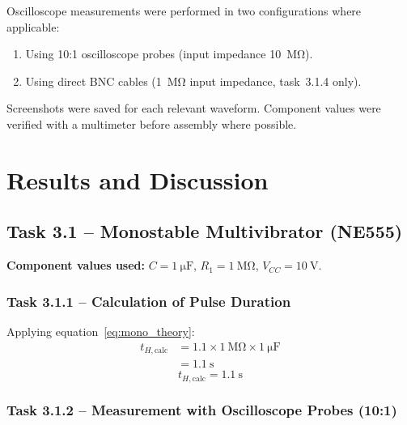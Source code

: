 \documentclass[12pt, a4paper]{article}
\begin{document}
Oscilloscope measurements were performed in two configurations where applicable:
\begin{enumerate}[leftmargin=1.5em]
  \item Using 10:1 oscilloscope probes (input impedance \SI{10}{\mega\ohm}).
  \item Using direct BNC cables (\SI{1}{\mega\ohm} input impedance, task~3.1.4 only).
\end{enumerate}

Screenshots were saved for each relevant waveform. Component values were verified
with a multimeter before assembly where possible.

\section{Results and Discussion}

\subsection{Task 3.1 -- Monostable Multivibrator (NE555)}

\textbf{Component values used:}
$C = \SI{1}{\micro\farad}$,\quad
$R_1 = \SI{1}{\mega\ohm}$,\quad
$V_{CC} = \SI{10}{\volt}$.

\subsubsection{Task 3.1.1 -- Calculation of Pulse Duration}

Applying equation~\eqref{eq:mono_theory}:
\begin{align*}
  t_{H,\text{calc}} &= 1.1 \times \SI{1}{\mega\ohm} \times \SI{1}{\micro\farad} \\
                    &= \SI{1.1}{\second}
\end{align*}
\[
  \boxed{t_{H,\text{calc}} = \SI{1.1}{\second}}
\]

\subsubsection{Task 3.1.2 -- Measurement with Oscilloscope Probes (10:1)}
\end{document}

